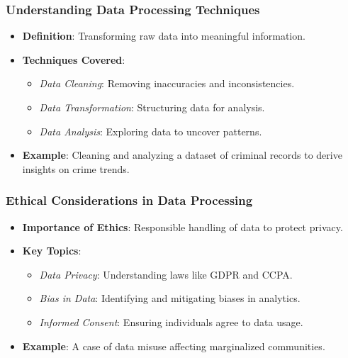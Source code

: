 \documentclass[aspectratio=169]{beamer}
\begin{document}
\begin{frame}[fragile]
    \frametitle{Understanding Data Processing Techniques}
    \begin{itemize}
        \item \textbf{Definition}: Transforming raw data into meaningful information.
        \item \textbf{Techniques Covered}:
            \begin{itemize}
                \item \textit{Data Cleaning}: Removing inaccuracies and inconsistencies.
                \item \textit{Data Transformation}: Structuring data for analysis.
                \item \textit{Data Analysis}: Exploring data to uncover patterns.
            \end{itemize}
        \item \textbf{Example}: Cleaning and analyzing a dataset of criminal records to derive insights on crime trends.
    \end{itemize}
\end{frame}

\begin{frame}[fragile]
    \frametitle{Ethical Considerations in Data Processing}
    \begin{itemize}
        \item \textbf{Importance of Ethics}: Responsible handling of data to protect privacy.
        \item \textbf{Key Topics}:
            \begin{itemize}
                \item \textit{Data Privacy}: Understanding laws like GDPR and CCPA.
                \item \textit{Bias in Data}: Identifying and mitigating biases in analytics.
                \item \textit{Informed Consent}: Ensuring individuals agree to data usage.
            \end{itemize}
        \item \textbf{Example}: A case of data misuse affecting marginalized communities.
    \end{itemize}
\end{frame}
\end{document}

